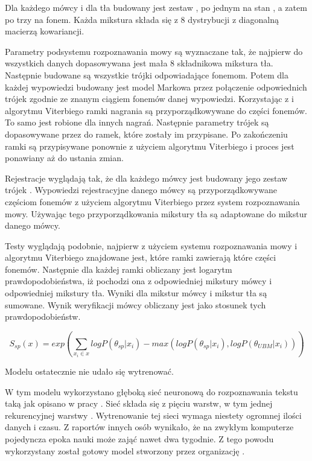 Dla każdego mówcy i dla tła budowany jest zestaw , po jednym na stan ,
a zatem po trzy na fonem. Każda mikstura składa się z $8$ dystrybucji z diagonalną macierzą kowariancji.

Parametry podsystemu rozpoznawania mowy są wyznaczane tak, że najpierw do wszystkich danych
dopasowywana jest mała 8 składnikowa mikstura tła. Następnie budowane są wszystkie trójki 
odpowiadające fonemom. Potem dla każdej wypowiedzi budowany jest model Markowa przez połączenie odpowiednich
trójek zgodnie ze znanym ciągiem fonemów danej wypowiedzi. Korzystając z  i algorytmu Viterbiego
ramki nagrania są przyporządkowywane do części fonemów. To samo jest robione dla innych nagrań.
Następnie parametry trójek  są dopasowywane przez  do ramek, które zostały im przypisane.
Po zakończeniu ramki są przypisywane ponownie z użyciem algorytmu Viterbiego i proces jest ponawiany aż do ustania zmian.

Rejestracje wyglądają tak, że dla każdego mówcy jest budowany jego zestaw trójek .
Wypowiedzi rejestracyjne danego mówcy są przyporządkowywane
częściom fonemów z użyciem algorytmu Viterbiego przez system rozpoznawania mowy.
Używając tego przyporządkowania mikstury tła są  adaptowane
do mikstur danego mówcy.

Testy wyglądają podobnie, najpierw z użyciem systemu rozpoznawania mowy i algorytmu Viterbiego znajdowane
jest, które ramki zawierają które części fonemów. Następnie dla każdej ramki obliczany jest logarytm prawdopodobieństwa,
iż pochodzi ona z odpowiedniej mikstury mówcy i odpowiedniej mikstury tła. Wyniki dla mikstur mówcy i mikstur tła są
sumowane. Wynik weryfikacji mówcy obliczany jest jako stosunek tych prawdopodobieństw.

$$S_{sp}(x) = exp(\sum_{x_i \in x} log P(\theta_{sp} | x_i) - max(log P(\theta_{sp} | x_i), log P(\theta_{UBM} | x_i)))$$

Modelu ostatecznie nie udało się wytrenować. %

\label{sec:dnn_gmm}

W tym modelu wykorzystano głęboką sieć neuronową do rozpoznawania tekstu taką jak opisano w pracy \cite{endToEnd}.
Sieć składa się z pięciu warstw, w tym jednej rekurencyjnej warstwy .
Wytrenowanie tej sieci wymaga niestety ogromnej ilości danych i czasu. Z raportów innych osób wynikało, że na
zwykłym komputerze pojedyncza epoka nauki może zająć nawet dwa tygodnie. Z tego powodu wykorzystany został
gotowy model stworzony przez organizację .

